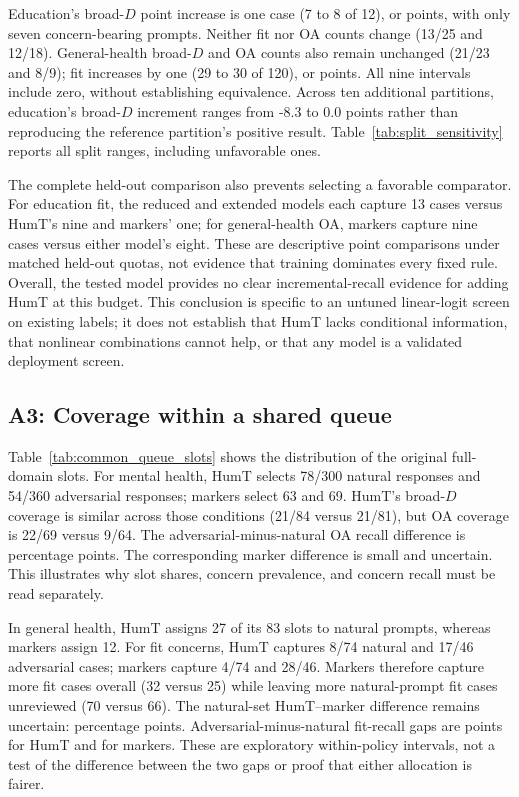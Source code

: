 \documentclass[manuscript,screen,review,anonymous]{acmart}
\begin{document}
Education's broad-$D$ point increase is one case (7 to 8 of 12), or \EDDConditional{} points, with only seven concern-bearing prompts. Neither fit nor OA counts change (13/25 and 12/18). General-health broad-$D$ and OA counts also remain unchanged (21/23 and 8/9); fit increases by one (29 to 30 of 120), or \GHFConditional{} points. All nine intervals include zero, without establishing equivalence. Across ten additional partitions, education's broad-$D$ increment ranges from -8.3 to 0.0 points rather than reproducing the reference partition's positive result. Table~\ref{tab:split_sensitivity} reports all split ranges, including unfavorable ones.

The complete held-out comparison also prevents selecting a favorable comparator. For education fit, the reduced and extended models each capture 13 cases versus HumT's nine and markers' one; for general-health OA, markers capture nine cases versus either model's eight. These are descriptive point comparisons under matched held-out quotas, not evidence that training dominates every fixed rule. Overall, the tested model provides no clear incremental-recall evidence for adding HumT at this budget. This conclusion is specific to an untuned linear-logit screen on existing labels; it does not establish that HumT lacks conditional information, that nonlinear combinations cannot help, or that any model is a validated deployment screen.

\subsection{A3: Coverage within a shared queue}
Table~\ref{tab:common_queue_slots} shows the distribution of the original full-domain slots. For mental health, HumT selects 78/300 natural responses and 54/360 adversarial responses; markers select 63 and 69. HumT's broad-$D$ coverage is similar across those conditions (21/84 versus 21/81), but OA coverage is 22/69 versus 9/64. The adversarial-minus-natural OA recall difference is \MHQueueOAGap{} percentage points. The corresponding marker difference is small and uncertain. This illustrates why slot shares, concern prevalence, and concern recall must be read separately.


In general health, HumT assigns 27 of its 83 slots to natural prompts, whereas markers assign 12. For fit concerns, HumT captures 8/74 natural and 17/46 adversarial cases; markers capture 4/74 and 28/46. Markers therefore capture more fit cases overall (32 versus 25) while leaving more natural-prompt fit cases unreviewed (70 versus 66). The natural-set HumT--marker difference remains uncertain: \GHQueueNaturalFitContrast{} percentage points. Adversarial-minus-natural fit-recall gaps are \GHQueueFitGapH{} points for HumT and \GHQueueFitGapM{} for markers. These are exploratory within-policy intervals, not a test of the difference between the two gaps or proof that either allocation is fairer.
\end{document}
